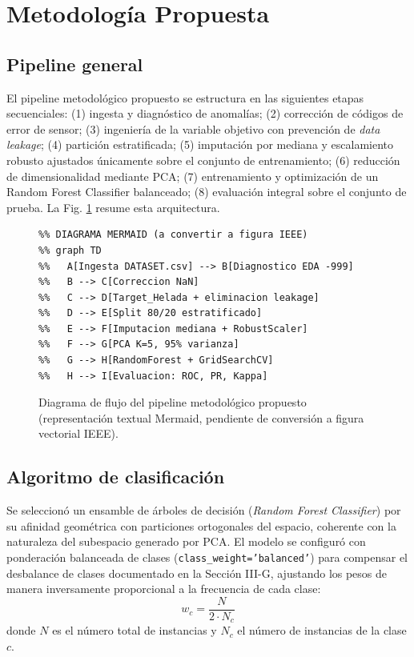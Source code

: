 \section{Metodología Propuesta}\label{sec:methodology}
 
\subsection{Pipeline general}
El pipeline metodológico propuesto se estructura en las siguientes etapas secuenciales: (1) ingesta y diagnóstico de anomalías; (2) corrección de códigos de error de sensor; (3) ingeniería de la variable objetivo con prevención de \emph{data leakage}; (4) partición estratificada; (5) imputación por mediana y escalamiento robusto ajustados únicamente sobre el conjunto de entrenamiento; (6) reducción de dimensionalidad mediante PCA; (7) entrenamiento y optimización de un Random Forest Classifier balanceado; (8) evaluación integral sobre el conjunto de prueba. La Fig. \ref{fig:pipeline} resume esta arquitectura.
 
\begin{figure}[H]
\centering
\begin{verbatim}
%% DIAGRAMA MERMAID (a convertir a figura IEEE)
%% graph TD
%%   A[Ingesta DATASET.csv] --> B[Diagnostico EDA -999]
%%   B --> C[Correccion NaN]
%%   C --> D[Target_Helada + eliminacion leakage]
%%   D --> E[Split 80/20 estratificado]
%%   E --> F[Imputacion mediana + RobustScaler]
%%   F --> G[PCA K=5, 95% varianza]
%%   G --> H[RandomForest + GridSearchCV]
%%   H --> I[Evaluacion: ROC, PR, Kappa]
\end{verbatim}
\caption{Diagrama de flujo del pipeline metodológico propuesto (representación textual Mermaid, pendiente de conversión a figura vectorial IEEE).}
\label{fig:pipeline}
\end{figure}
 
\subsection{Algoritmo de clasificación}
Se seleccionó un ensamble de árboles de decisión (\emph{Random Forest Classifier}) por su afinidad geométrica con particiones ortogonales del espacio, coherente con la naturaleza del subespacio generado por PCA. El modelo se configuró con ponderación balanceada de clases (\texttt{class\_weight='balanced'}) para compensar el desbalance de clases documentado en la Sección III-G, ajustando los pesos de manera inversamente proporcional a la frecuencia de cada clase:
\begin{equation}
w_c = \frac{N}{2 \cdot N_c}
\label{eq:classweight}
\end{equation}
donde $N$ es el número total de instancias y $N_c$ el número de instancias de la clase $c$.
 
